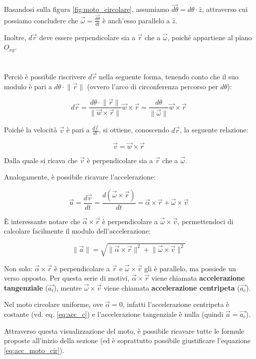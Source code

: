 \documentclass[oneside]{book}
\newcommand{\norm}[1]{\lVert \vec{#1} \rVert}
\newcommand{\nnorm}[1]{\lVert #1 \rVert}
\begin{document}
Basandosi sulla figura \ref{fig:moto_circolare}, assumiamo
$\vec{d\theta} = d\theta \cdot \hat{z}$, attraverso cui
possiamo concludere che $\vec{\omega}=\frac{\vec{d\theta}}{dt}$ è anch'esso
parallelo a $\hat{z}$.

Inoltre, $d\vec{r}$ deve essere perpendicolare sia a $\vec{r}$ che
a $\vec{\omega}$, poiché appartiene al piano $O_{xy}$. \\ \\ \\

Perciò è possibile riscrivere $d\vec{r}$ nella seguente forma, tenendo
conto che il suo modulo è pari a $d\theta \cdot \norm{r}$ (ovvero
l'arco di circonferenza percorso per $d\theta$):

\begin{equation*}
    d\vec{r}=\frac{d\theta \cdot \norm{r}}{\lVert \vec{w} \times
    \vec{r} \rVert} \vec{w} \times \vec{r} =
    \frac{d\theta}{\norm{\omega}} \vec{w} \times \vec{r}
\end{equation*}

Poiché la velocità $\vec{v}$ è pari a $\frac{d\vec{r}}{dt}$, si ottiene,
conoscendo $d\vec{r}$, la seguente relazione:

\begin{equation}
    \vec{v}=\vec{w}\times\vec{r}
\end{equation}

Dalla quale si ricava che $\vec{v}$ è perpendicolare sia a $\vec{r}$ che
a $\vec{\omega}$.

Analogamente, è possibile ricavare l'accelerazione:

\begin{equation}
    \vec{a}=\frac{d\vec{v}}{dt}=\frac{d(\vec{\omega}
    \times \vec{r})}{dt}=\vec{\alpha} \times \vec{r}
    + \vec{\omega} \times \vec{v}
\end{equation}

È interessante notare che $\vec{\alpha} \times \vec{r}$
è perpendicolare a $\vec{\omega} \times \vec{v}$, permettendoci
di calcolare facilmente il modulo dell'accelerazione:

\begin{equation}
    \norm{a} = \sqrt{\nnorm{\vec{\alpha} \times \vec{r}}^2 + \nnorm{\vec{\omega} \times \vec{v}}^2}
\end{equation}

Non solo: $\vec{\alpha} \times \vec{r}$ è perpendicolare a $\vec{r}$ e
$\vec{\omega} \times \vec{v}$ gli è parallelo, ma possiede un verso opposto.
Per questa serie di motivi, $\vec{\alpha} \times \vec{r}$ viene chiamata
\textbf{accelerazione tangenziale} ($\vec{a_t}$), mentre
$\vec{\omega} \times \vec{v}$ viene chiamata \textbf{accelerazione centripeta}
($\vec{a_c}$).

Nel moto circolare uniforme, ove $\vec{\alpha}=0$, infatti l'accelerazione
centripeta è costante (vd. eq. \ref{eq:acc_c}) e l'accelerazione tangenziale
è nulla (quindi $\vec{a}=\vec{a_c}$).

Attraverso questa visualizzazione del moto, è possibile ricavare tutte
le formule proposte all'inizio della sezione (ed è soprattutto
possibile giustificare l'equazione \ref{eq:acc_moto_cir}).
\end{document}
